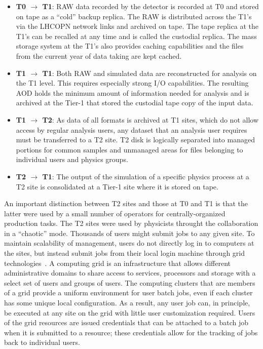 \begin{itemize}
\item {\bf T0 $\to$ T1}: RAW data recorded by the detector is recorded at
  T0 and stored on tape as a ``cold'' backup replica. The RAW is
  distributed across the T1's via the LHCOPN network links and archived on
  tape. The tape replica at the T1's can be recalled at any time and is
  called the custodial replica. The mass storage system at the T1's also
  provides caching capabilities and the files from the current year of data
  taking are kept cached.

\item {\bf T1 $\to$ T1}: Both RAW and simulated data are reconstructed for
  analysis on the T1 level. This requires especially strong I/O
  capabilities. The resulting AOD holds the minimum amount of information
  needed for analysis and is archived at the Tier-1 that stored the
  custodial tape copy of the input data.

\item {\bf T1 $\to$ T2}: As data of all formats is archived at T1 sites,
  which do not allow access by regular analysis users, any dataset that an
  analysis user requires must be transferred to a T2 site.  T2 disk is
  logically separated into managed portions for common samples and
  unmanaged areas for files belonging to individual users and physics
  groups.

\item {\bf T2 $\to$ T1}: The output of the simulation of a specific physics
  process at a T2 site is consolidated at a Tier-1 site where it is stored
  on tape.
\end{itemize}

An important distinction between T2 sites and those at T0 and T1 is that
the latter were used by a small number of operators for centrally-organized
production tasks.  The T2 sites were used by physicists throught the
collaboration in a ``chaotic'' mode.  Thousands of users might submit jobs
to any given site.  To maintain scalability of management, users do not
directly log in to computers at the sites, but instead submit jobs from
their local login machine through grid technologies~\cite{thegrid}.  A
computing grid is an infrastructure that allows different administrative
domains to share access to services, processors and storage with a select
set of users and groups of users. The computing clusters that are members
of a grid provide a uniform environment for user batch jobs, even if each
cluster has some unique local configuration.  As a result, any user job
can, in principle, be executed at any site on the grid with little user
customization required.  Users of the grid resources are issued credentials
that can be attached to a batch job when it is submitted to a resource;
these credentials allow for the tracking of jobs back to individual users.

